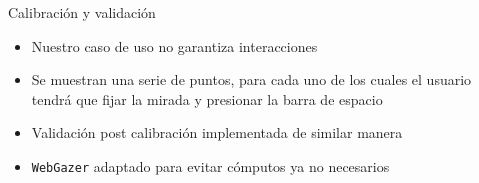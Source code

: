 \documentclass[aspectratio=169]{beamer}
\begin{document}
\begin{frame}{Calibración y validación}
  \begin{itemize}
    \item Nuestro caso de uso no garantiza interacciones

    \item Se muestran una serie de puntos, para cada uno de los cuales el
      usuario tendrá que fijar la mirada y presionar la barra de espacio
    
    \item Validación post calibración implementada de similar manera

    \item[\emoji{party-popper}] \texttt{WebGazer} adaptado para evitar cómputos
      ya no necesarios
  \end{itemize}
\end{frame}
\end{document}
